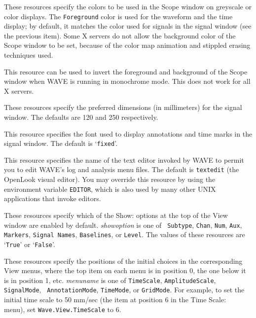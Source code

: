 \documentclass[twoside]{book}
\newcommand{\keycap}[1]{\cornersize{.5}\Ovalbox{\small\sf #1}}
\newcommand{\amenubutton}[1]{{\sf #1}~\keycap{\ensuremath{\nabla}}}
\newcommand{\WAVE}{{\sf WAVE}\xspace}
\begin{document}
\begin{description}
These resources specify the colors to be used in the {\sf Scope}
window on greyscale or color displays.  The {\tt Foreground} color is
used for the waveform and the time display; by default, it matches the
color used for signals in the signal window (see the previous item).
Some X servers do not allow the background color of the {\sf Scope}
window to be set, because of the color map animation and stippled
erasing techniques used.

\item[{\tt Wave.Scope.Mono.Background}]
This resource can be used to invert the foreground and background of
the {\sf Scope} window when \WAVE{} is running in monochrome mode.
This does not work for all X servers.

\item[{\tt Wave.SignalWindow.\{Height\_mm|Width\_mm\}}]
These resources specify the preferred dimensions (in millimeters) for the
signal window.  The defaults are 120 and 250 respectively.

\item[{\tt Wave.SignalWindow.Font}]
This resource specifies the font used to display annotations and time marks in
the signal window.  The default is `{\tt fixed}'.

\item[{\tt Wave.TextEditor}]
This resource specifies the name of the text editor invoked by \WAVE{} to
permit you to edit \WAVE{}'s log and analysis menu files.  The default is
{\tt textedit} (the OpenLook visual editor).  You may override this resource
by using the environment variable {\tt EDITOR}, which is also used by many
other UNIX applications that invoke editors.

\item[{\tt Wave.View.{\it showoption}}]
These resources specify which of the {\sf Show:} options at the top of the
{\sf View} window are enabled by default.  {\it showoption} is one of {\tt
Subtype}, {\tt Chan}, {\tt Num}, {\tt Aux}, {\tt Markers}, {\tt Signal
Names}, {\tt Baselines}, or {\tt Level}.  The values of these
resources are `{\tt True}' or `{\tt False}'.

\item[{\tt Wave.View.{\it menuname}}]
These resources specify the positions of the initial choices in the
corresponding {\sf View} menus, where the top item on each menu is in
position 0, the one below it is in position 1, etc.  {\it menuname} is
one of {\tt TimeScale}, {\tt AmplitudeScale}, {\tt SignalMode}, {\tt
AnnotationMode}, {\tt TimeMode}, or {\tt GridMode}.  For example, to set the
initial time scale to 50 mm/sec (the item at position 6 in the 
\amenubutton{Time Scale:} menu), set {\tt Wave.View.TimeScale} to 6.


\end{description}
\end{document}
